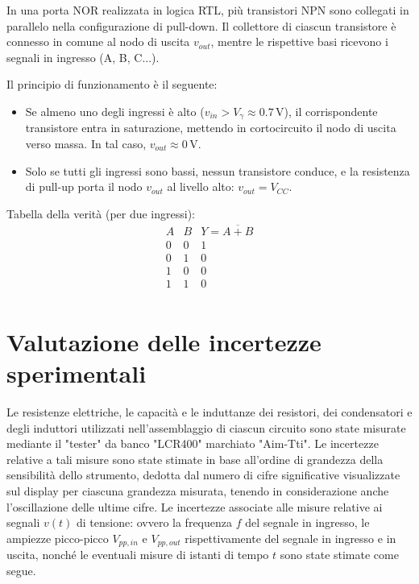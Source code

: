 \documentclass[a4paper,12pt]{article}
\begin{document}
In una porta NOR realizzata in logica RTL, più transistori NPN sono collegati in parallelo nella configurazione di pull-down. Il collettore di ciascun transistore è connesso in comune al nodo di uscita \(v_{out}\), mentre le rispettive basi ricevono i segnali in ingresso (A, B, C...).

Il principio di funzionamento è il seguente:
\begin{itemize}
  \item Se almeno uno degli ingressi è alto (\(v_{in} > V_{\gamma} \approx 0.7\,\mathrm{V}\)), il corrispondente transistore entra in saturazione, mettendo in cortocircuito il nodo di uscita verso massa. In tal caso, \(v_{out} \approx 0\,\mathrm{V}\).
  \item Solo se tutti gli ingressi sono bassi, nessun transistore conduce, e la resistenza di pull-up porta il nodo \(v_{out}\) al livello alto: \(v_{out} = V_{CC}\).
\end{itemize}

Tabella della verità (per due ingressi):
\[
\begin{array}{c|c|c}
A & B & Y = \overline{A + B} \\
\hline
0 & 0 & 1 \\
0 & 1 & 0 \\
1 & 0 & 0 \\
1 & 1 & 0 \\
\end{array}
\]
      

\section{Valutazione delle incertezze sperimentali}
Le resistenze elettriche, le capacità e le induttanze dei resistori, dei condensatori e degli induttori utilizzati nell’assemblaggio di ciascun circuito sono state misurate mediante il "tester" da banco "LCR400" marchiato "Aim-Tti". Le incertezze relative a tali misure sono state stimate in base all’ordine di grandezza della sensibilità dello strumento, dedotta dal numero di cifre significative visualizzate sul display per ciascuna grandezza misurata, tenendo in considerazione anche l'oscillazione delle ultime cifre.
Le incertezze associate alle misure relative ai segnali $v(t)$ di tensione: ovvero la frequenza $f$ del segnale in ingresso, le ampiezze picco-picco $V_{pp,in}$ e $V_{pp,out}$ rispettivamente del segnale in ingresso e in uscita, nonché le eventuali misure di istanti di tempo $t$ sono state stimate come segue.
\end{document}

